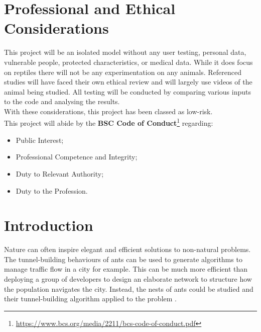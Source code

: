 \documentclass{article}
\begin{document}
\section*{Professional and Ethical Considerations}
\label{sec:Ethics}
This project will be an isolated model without any user testing, personal data, vulnerable people, protected characteristics, or medical data. While it does focus on reptiles there will not be any experimentation on any animals. Referenced studies will have faced their own ethical review and will largely use videos of the animal being studied. All testing will be conducted by comparing various inputs to the code and analysing the results.\\
With these considerations, this project has been classed as low-risk.\\

This project will abide by the \textbf{BSC Code of Conduct}\footnote{\url{https://www.bcs.org/media/2211/bcs-code-of-conduct.pdf}} regarding:
\begin{itemize}
 \item Public Interest;
 \item Professional Competence and Integrity;
 \item Duty to Relevant Authority;
 \item Duty to the Profession.
 \end{itemize}

\makeatletter
\renewcommand\footnoterule{\kern-3\p@\hrule\@width\ifodd\value{page}6in\else6in\fi\kern2.6\p@}
\makeatother 

\newpage
\pagestyle{fancy}
\fancyhf{}
\tableofcontents

\newpage
\section{Introduction}
\label{sec:Introduction}
Nature can often inspire elegant and efficient solutions to non-natural problems. The tunnel-building behaviours of ants can be used to generate algorithms to manage traffic flow in a city for example. This can be much more efficient than deploying a group of developers to design an elaborate network to structure how the population navigates the city. Instead, the nests of ants could be studied and their tunnel-building algorithm applied to the problem . \\
\end{document}
